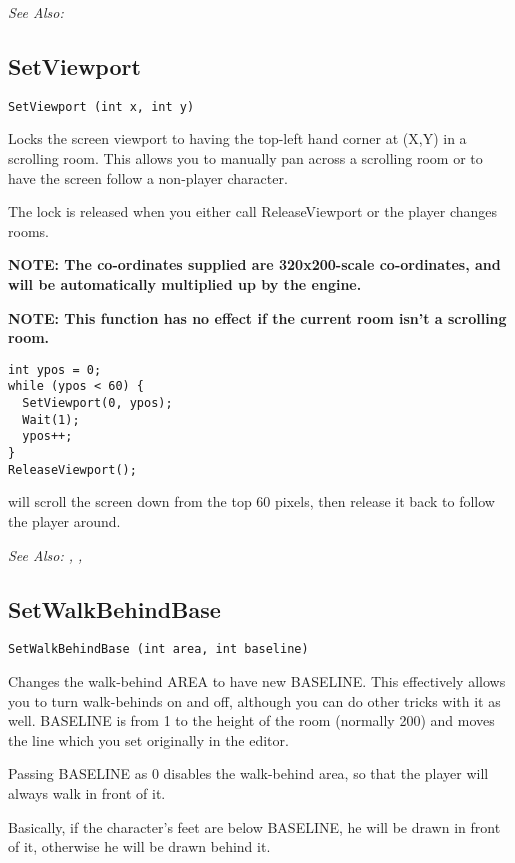 \it{See Also:} 


\subsection{SetViewport}\label{SetViewport}%

\begin{verbatim}
SetViewport (int x, int y)
\end{verbatim}
Locks the screen viewport to having the top-left hand corner at (X,Y) in
a scrolling room. This allows you to manually pan across a scrolling room
or to have the screen follow a non-player character.

The lock is released when you either call ReleaseViewport or the player
changes rooms.

\bf{NOTE:} The co-ordinates supplied are 320x200-scale co-ordinates, and will
be automatically multiplied up by the engine.

\bf{NOTE:} This function has no effect if the current room isn't a scrolling room.

\begin{verbatim}
int ypos = 0;
while (ypos < 60) {
  SetViewport(0, ypos);
  Wait(1);
  ypos++;
}
ReleaseViewport();
\end{verbatim}
will scroll the screen down from the top 60 pixels, then release it back
to follow the player around.

\it{See Also:} , , 


\subsection{SetWalkBehindBase}\label{SetWalkBehindBase}%

\begin{verbatim}
SetWalkBehindBase (int area, int baseline)
\end{verbatim}
Changes the walk-behind AREA to have new BASELINE. This effectively allows
you to turn walk-behinds on and off, although you can do other tricks with
it as well. BASELINE is from 1 to the height of the room (normally 200) and
moves the line which you set originally in the editor.

Passing BASELINE as 0 disables the walk-behind area, so that the player
will always walk in front of it.

Basically, if the character's feet are below BASELINE, he will be drawn in
front of it, otherwise he will be drawn behind it.

